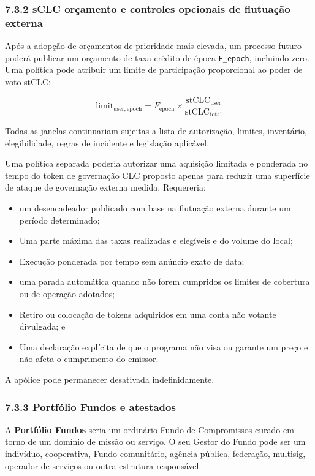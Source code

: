 \documentclass[11pt]{article}
\begin{document}
\subsubsection*{7.3.2 sCLC orçamento e controles opcionais de flutuação externa}

Após a adopção de orçamentos de prioridade mais elevada, um processo futuro poderá publicar um orçamento de taxa-crédito de época \texttt{F\_epoch}, incluindo zero. Uma política pode atribuir um limite de participação proporcional ao poder de voto stCLC:

\[
\mathrm{limit}_{\mathrm{user,epoch}} = F_{\mathrm{epoch}} \times \frac{\mathrm{stCLC}_{\mathrm{user}}}{\mathrm{stCLC}_{\mathrm{total}}}
\]

Todas as janelas continuariam sujeitas a lista de autorização, limites, inventário, elegibilidade, regras de incidente e legislação aplicável.

Uma política separada poderia autorizar uma aquisição limitada e ponderada no tempo do token de governação CLC proposto apenas para reduzir uma superfície de ataque de governação externa medida. Requereria:

\begin{itemize}[leftmargin=*]
\item um desencadeador publicado com base na flutuação externa durante um período determinado;
\item Uma parte máxima das taxas realizadas e elegíveis e do volume do local;
\item Execução ponderada por tempo sem anúncio exato de data;
\item uma parada automática quando não forem cumpridos os limites de cobertura ou de operação adotados;
\item Retiro ou colocação de tokens adquiridos em uma conta não votante divulgada; e
\item Uma declaração explícita de que o programa não visa ou garante um preço e não afeta o cumprimento do emissor.
\end{itemize}
A apólice pode permanecer desativada indefinidamente.

\subsubsection*{7.3.3 Portfólio Fundos e atestados}

A \textbf{Portfólio Fundos} seria um ordinário Fundo de Compromissos curado em torno de um domínio de missão ou serviço. O seu Gestor do Fundo pode ser um indivíduo, cooperativa, Fundo comunitário, agência pública, federação, multisig, operador de serviços ou outra estrutura responsável.
\end{document}
